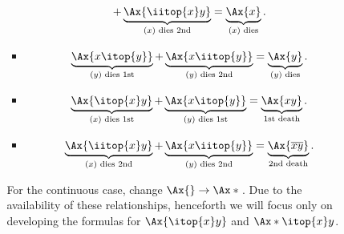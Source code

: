 \begin{enumerate}
\begin{enumerate}[label={(\arabic*)}]
\begin{enumerate}[label={(\roman*)}]
\begin{itemize}
\[+\underbrace{\Ax{\iitop{x}y}}_{\text{\((x)\) dies 2nd}}
=\underbrace{\Ax{x}}_{\text{\((x)\) dies}}.
\]
\item
\[
\underbrace{\Ax{x\itop{y}}}_{\text{\((y)\) dies 1st}}
+\underbrace{\Ax{x\iitop{y}}}_{\text{\((y)\) dies 2nd}}
=\underbrace{\Ax{y}}_{\text{\((y)\) dies}}.
\]
\item \[
\underbrace{\Ax{\itop{x}y}}_{\text{\((x)\) dies 1st}}
+\underbrace{\Ax{x\itop{y}}}_{\text{\((y)\) dies 1st}}
=\underbrace{\Ax{xy}}_{\text{1st death}}.
\]
\item \[
\underbrace{\Ax{\iitop{x}y}}_{\text{\((x)\) dies 2nd}}
+\underbrace{\Ax{x\iitop{y}}}_{\text{\((y)\) dies 2nd}}
=\underbrace{\Ax{\overline{xy}}}_{\text{2nd death}}.
\]
\end{itemize}
For the continuous case, change \(\Ax{}\to\Ax*{}\).  Due to the availability of
these relationships, henceforth we will focus only on developing the formulas
for \(\Ax{\itop{x}y}\) and \(\Ax*{\itop{x}y}\).


\end{enumerate}
\end{enumerate}
\end{enumerate}
